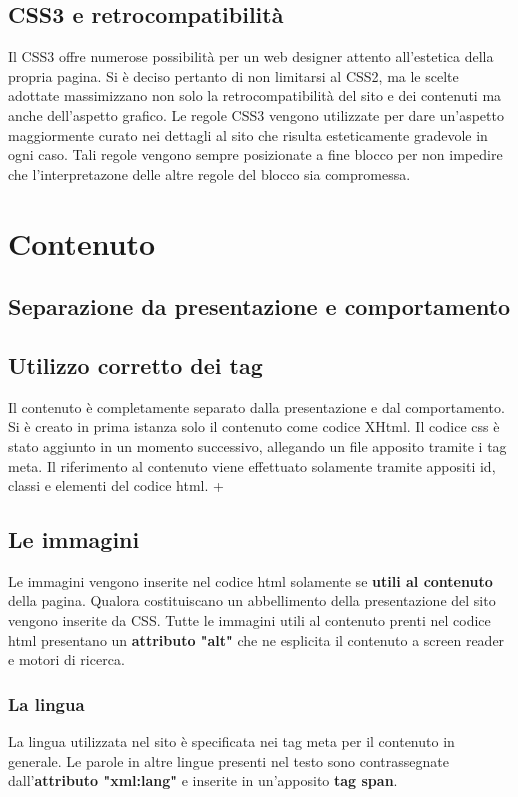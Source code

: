 \documentclass[12pt,a4paper]{article}
\begin{document}
\subsection{CSS3 e retrocompatibilità}
Il CSS3 offre numerose possibilità per un web designer attento all'estetica della propria pagina. 
Si è deciso pertanto di non limitarsi al CSS2, ma le scelte adottate massimizzano non solo la retrocompatibilità del sito e dei contenuti ma anche dell'aspetto grafico. 
Le regole CSS3 vengono utilizzate per dare un'aspetto maggiormente curato nei dettagli al sito che risulta esteticamente gradevole in ogni caso. 
Tali regole vengono sempre posizionate a fine blocco per non impedire che l'interpretazone delle altre regole del blocco sia compromessa. 
\section{Contenuto}
\subsection{Separazione da presentazione e comportamento}
\subsection{Utilizzo corretto dei tag}
Il contenuto è completamente separato dalla presentazione e dal comportamento. 
Si è creato in prima istanza solo il contenuto come codice XHtml. Il codice css è stato aggiunto in un momento successivo, allegando un file apposito tramite i tag meta. 
Il riferimento al contenuto viene effettuato solamente tramite appositi id, classi e elementi del codice html. +
 
\subsection{Le immagini}
Le immagini vengono inserite nel codice html solamente se \textbf{utili al contenuto} della pagina. 
Qualora costituiscano un abbellimento della presentazione del sito vengono inserite da CSS. 
Tutte le immagini utili al contenuto prenti nel codice html presentano un \textbf{attributo "alt"} che ne esplicita il contenuto a screen reader e motori di ricerca. 

\subsubsection{La lingua} La lingua utilizzata nel sito è specificata nei tag meta per il contenuto in generale. 
Le parole in altre lingue presenti nel testo sono contrassegnate dall'\textbf{attributo "xml:lang"}  e inserite in un'apposito \textbf{tag span}.
\end{document}
